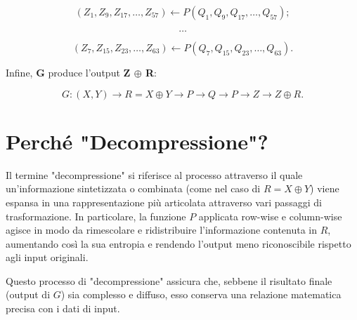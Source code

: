 \documentclass[a4paper,12pt]{report}
\begin{document}
			\[
			(Z_1, Z_9, Z_{17}, \dots, Z_{57}) \leftarrow P(Q_1, Q_9, Q_{17}, \dots, Q_{57});
			\]

			\[
			\ldots
			\]

			\[
			(Z_7, Z_{15}, Z_{23}, \dots, Z_{63}) \leftarrow P(Q_7, Q_{15}, Q_{23}, \dots, Q_{63}).
			\]

			Infine, \textbf{G} produce l'output \textbf{Z $\oplus$ R}:

			\[
			G : (X, Y) \rightarrow R = X \oplus Y \rightarrow P \rightarrow Q \rightarrow P \rightarrow Z \rightarrow Z \oplus R.
			\]
			
			\section*{Perché "Decompressione"?}
			
			Il termine "decompressione" si riferisce al processo attraverso il
			quale un'informazione sintetizzata o combinata (come nel caso di \(
			R = X \oplus Y \)) viene espansa in una rappresentazione più
			articolata attraverso vari passaggi di trasformazione. In
			particolare, la funzione \( P \) applicata row-wise e column-wise
			agisce in modo da rimescolare e ridistribuire l'informazione
			contenuta in \( R \), aumentando così la sua entropia e rendendo
			l'output meno riconoscibile rispetto agli input originali.
			
			Questo processo di "decompressione" assicura che, sebbene il
			risultato finale (output di \( G \)) sia complesso e diffuso, esso
			conserva una relazione matematica precisa con i dati di input.
		
\end{document}
